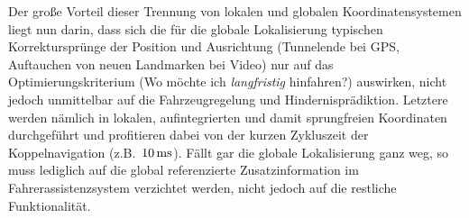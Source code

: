 Der große Vorteil dieser Trennung von lokalen und globalen Koordinatensystemen liegt nun darin, dass sich die für die globale Lokalisierung typischen Korrektursprünge der Position und Ausrichtung (Tunnelende bei GPS, Auftauchen von neuen Landmarken bei Video) nur auf das Optimierungskriterium (Wo möchte ich \emph{langfristig} hinfahren?) auswirken, nicht jedoch unmittelbar auf die Fahrzeugregelung und Hindernisprädiktion. Letztere werden nämlich in lokalen, aufintegrierten und damit sprungfreien Koordinaten durchgeführt und profitieren dabei von der kurzen Zykluszeit der Koppelnavigation (z.B.\ $\unit[10]{ms}$).
Fällt gar die globale Lokalisierung ganz weg, so muss lediglich auf die global referenzierte Zusatzinformation im Fahrerassistenzsystem verzichtet werden, nicht jedoch auf die restliche Funktionalität.

